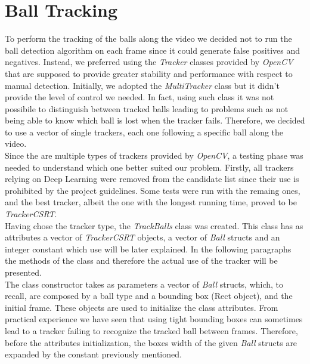 \section{Ball Tracking}

To perform the tracking of the balls along the video we decided not to run the ball detection algorithm on each frame since it could generate false positives and negatives.
Instead, we preferred using the \textit{Tracker} classes provided by \textit{OpenCV} that are supposed to provide greater stability and performance with respect to manual detection.
Initially, we adopted the \textit{MultiTracker} class but it didn't provide the level of control we needed. In fact, using such class it was not possibile to distinguish
between tracked balls leading to problems such as not being able to know which ball is lost when the tracker fails. Therefore, we decided to use a vector of single trackers,
each one following a specific ball along the video.
\newline \\
Since the are multiple types of trackers provided by \textit{OpenCV}, a testing phase was needed to understand which one better suited our problem. Firstly, all trackers
relying on Deep Learning were removed from the candidate list since their use is prohibited by the project guidelines. Some tests were run with the remaing ones, and the best tracker,
albeit the one with the longest running time, proved to be \textit{TrackerCSRT}.
\newline \\
Having chose the tracker type, the \textit{TrackBalls} class was created. This class has as attributes a vector of \textit{TrackerCSRT} objects, a vector of \textit{Ball} structs
and an integer constant which use will be later explained. In the following paragraphs the methods of the class and therefore the actual use of the tracker will be presented.
\newline \\
The class constructor takes as parameters a vector of \textit{Ball} structs, which, to recall, are composed by a ball type and a bounding box (Rect object), and the initial frame.
These objects are used to initialize the class attributes. From practical experience we have seen that using tight bounding boxes can sometimes lead to a tracker failing
to recognize the tracked ball between frames. Therefore, before the attributes initialization, the boxes width of the given \textit{Ball} structs are expanded by the constant
previously mentioned. 
\newline \\
